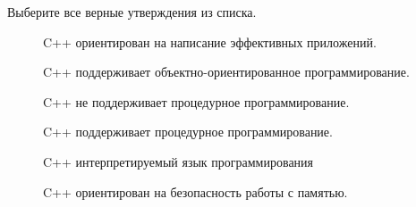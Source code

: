\documentclass[
    9pt,
    hyperref={pdfencoding=unicode}
    ]{beamer}
\begin{document}
\begin{frame}
    Выберите все верные утверждения из списка.
    \begin{description}
        \item[\XBox]  C++ ориентирован на написание эффективных
        приложений.
        \item[\XBox]  C++ поддерживает объектно-ориентированное
        программирование.
        \item[\Square]  C++ не поддерживает процедурное
        программирование.
        \item[\XBox]  C++ поддерживает процедурное
        программирование.
        \item[\Square]  C++ интерпретируемый язык программирования
        \item[\Square]  C++ ориентирован на безопасность работы с памятью.
    \end{description}
\end{frame}
\end{document}
